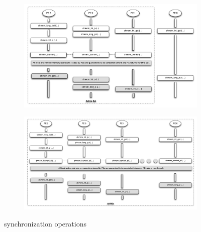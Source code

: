 \begin{figure}
\begin{subfigure}{0.48\textwidth}
                \caption{}
                \label{fig:quiet}
        \end{subfigure}
	\begin{subfigure}{0.48\textwidth}
		\includegraphics[width=\textwidth]{diagrams/updated/barrier}
		\caption{}
		\label{fig:barrier}
	\end{subfigure}
	\begin{subfigure}{0.48\textwidth}
		\includegraphics[width=\textwidth]{diagrams/updated/barrierall}
		\caption{}
		\label{fig:barrierall}
	\end{subfigure}
        \caption{\OSH{} synchronization operations}\label{fig:animals}
\end{figure}
